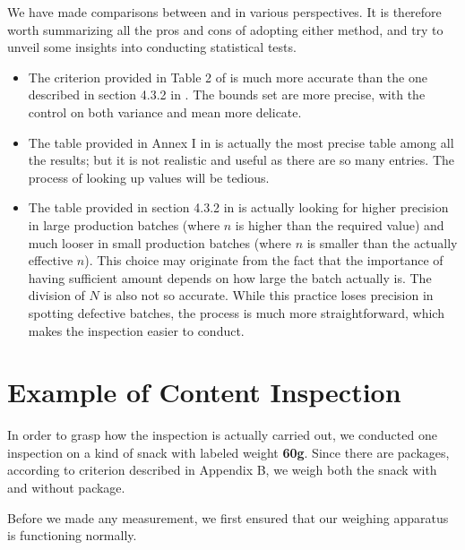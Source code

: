 \documentclass[12pt]{article}
\begin{document}
We have made comparisons between \cite{JJF2005} and \cite{OIML2016} in various perspectives. It is therefore worth summarizing all the pros and cons of adopting either method, and try to unveil some insights into conducting statistical tests.

\begin{itemize}
    \item The criterion provided in Table 2 of \cite{OIML2016} is much more accurate than the one described in section 4.3.2 in \cite{JJF2005}. The bounds set are more precise, with the control on both variance and mean more delicate.
    \item The table provided in Annex I in \cite{OIML2016} is actually the most precise table among all the results; but it is not realistic and useful as there are so many entries. The process of looking up values will be tedious. 
    \item The table provided in section 4.3.2 in \cite{JJF2005} is actually looking for higher precision in large production batches (where $n$ is higher than the required value) and much looser in small production batches (where $n$ is smaller than the actually effective $n$). This choice may originate from the fact that the importance of having sufficient amount depends on how large the batch actually is. The division of $N$ is also not so accurate. While this practice loses precision in spotting defective batches, the process is much more straightforward, which makes the inspection easier to conduct. 
\end{itemize}

\section{Example of Content Inspection}

In order to grasp how the inspection is actually carried out, we conducted one inspection on a kind of snack with labeled weight \textbf{60g}. Since there are packages, according to criterion described in Appendix B, we weigh both the snack with and without package. 

Before we made any measurement, we first ensured that our weighing apparatus is functioning normally.
\newpage
\end{document}
